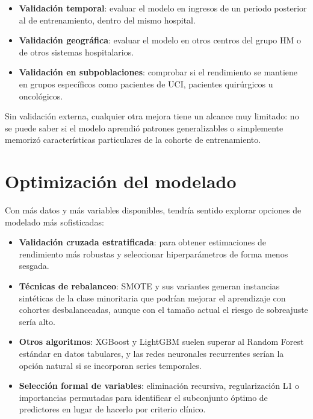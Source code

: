 \documentclass[12pt, a4paper, oneside]{report}
\begin{document}
\begin{itemize}
    \item \textbf{Validación temporal}: evaluar el modelo en ingresos de un periodo posterior al de entrenamiento, dentro del mismo hospital.
    \item \textbf{Validación geográfica}: evaluar el modelo en otros centros del grupo HM o de otros sistemas hospitalarios.
    \item \textbf{Validación en subpoblaciones}: comprobar si el rendimiento se mantiene en grupos específicos como pacientes de UCI, pacientes quirúrgicos u oncológicos.
\end{itemize}

Sin validación externa, cualquier otra mejora tiene un alcance muy limitado: no se puede saber si el modelo aprendió patrones generalizables o simplemente memorizó características particulares de la cohorte de entrenamiento.

\section{Optimización del modelado}

Con más datos y más variables disponibles, tendría sentido explorar opciones de modelado más sofisticadas:

\begin{itemize}
    \item \textbf{Validación cruzada estratificada}: para obtener estimaciones de rendimiento más robustas y seleccionar hiperparámetros de forma menos sesgada.
    
    \item \textbf{Técnicas de rebalanceo}: SMOTE \parencite{chawla2002smote} y sus variantes generan instancias sintéticas de la clase minoritaria que podrían mejorar el aprendizaje con cohortes desbalanceadas, aunque con el tamaño actual el riesgo de sobreajuste sería alto.
    
    \item \textbf{Otros algoritmos}: XGBoost y LightGBM suelen superar al Random Forest estándar en datos tabulares, y las redes neuronales recurrentes serían la opción natural si se incorporan series temporales.
    
    \item \textbf{Selección formal de variables}: eliminación recursiva, regularización L1 o importancias permutadas para identificar el subconjunto óptimo de predictores en lugar de hacerlo por criterio clínico.
\end{itemize}
\end{document}
